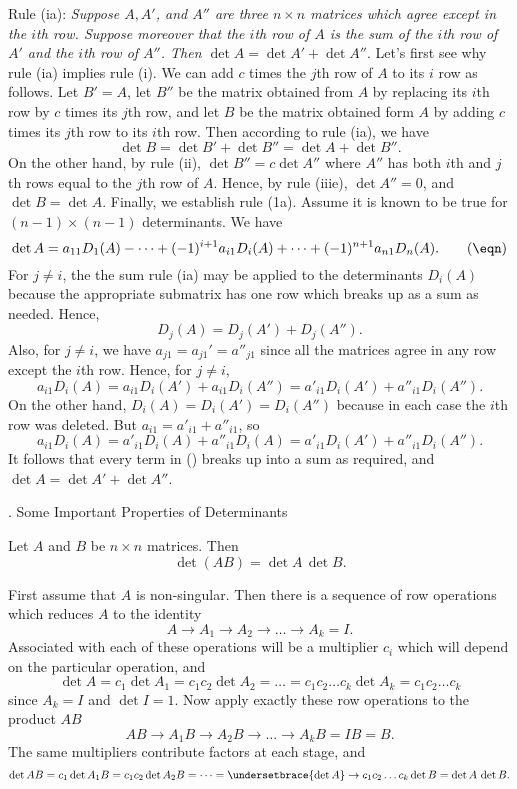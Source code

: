\noindent
Rule (ia):  {\it Suppose $A, A'$, and $A''$ are three $n\times n$
matrices which agree except in the $i$th row.  Suppose moreover
that the $i$th row of $A$ is the sum of the $i$th row of $A'$
and the $i$th row of $A''$.  Then  $\det A = \det A' + \det A''$}.
\medskip
Let's first see why rule (ia) implies rule (i).   We can add
$c$ times the $j$th row of $A$ to its $i$ row as follows.
Let $B' = A$, let $B''$ be the matrix obtained from $A$ by
replacing its $i$th row by $c$ times its $j$th row, and let
$B$ be the matrix obtained form $A$ by adding $c$ times its $j$th row
to its $i$th row.
 Then according to rule (ia), we have
$$
\det B = \det B' + \det B'' = \det A + \det B''.
$$
On the other hand, by rule (ii), $\det B'' = c\det A''$
where $A''$ has both $i$th and $j$th rows equal to the
$j$th row of $A$.  Hence, by rule (iiie), $\det A'' = 0$,
and $\det B = \det A$.
\medskip
Finally, we establish rule (1a).  Assume it is known to be true
for $(n-1)\times(n-1)$ determinants.  We have
\nexteqn
$$
\det A = a_{11}D_1(A) - \dots + (-1)^{i+1}a_{i1}D_i(A) +
\dots + (-1)^{n+1}a_{n1}D_n(A).\tag\eqn
$$
For $j\not= i$, the the sum rule (ia) may be applied to the
determinants $D_i(A)$ because the appropriate submatrix
has one row which breaks up as a sum as needed.  Hence,
$$
D_j(A) = D_j(A') + D_j(A'').
$$
Also, for $j\not = i$, we have $a_{j1} = a_{j1}'  = a''_{j1}$ since
all the matrices agree in any row except the $i$th row.
Hence, for $j\not=i$,
$$
a_{i1}D_i(A) = a_{i1}D_i(A') + a_{i1}D_i(A'')
= a'_{i1}D_i(A') + a''_{i1}D_i(A'').
$$
On the other hand, $D_i(A) = D_i(A') = D_i(A'')$ because
in each case the $i$th row was deleted.
But $a_{i1} = a'_{i1} + a''_{i1}$, so
$$
a_{i1}D_i(A) = a'_{i1}D_i(A) + a''_{i1}D_i(A)
= a'_{i1}D_i(A') + a''_{i1}D_i(A'').
$$
It follows that every term in (\eqn) breaks up into a sum
as required, and $\det A = \det A' + \det A''$.
\bigskip

\bigskip

\head \sn.  Some Important Properties of Determinants \endhead

\nextthm
{}
Let $A$ and $B$ be $n\times n$ matrices.   Then
$$
\det (AB) = \det A\, \det B.
$$
\endproclaim

  First assume that $A$ is non-singular.   
Then there is a sequence of row operations which reduces $A$
to the identity
$$
A \to A_1 \to A_2 \to \hdots \to A_k = I.
$$
Associated with each of these operations will be a multiplier
$c_i$ which will depend on the particular operation, and
$$
\det A = c_1\det A_1 = c_1c_2\det A_2 = \dots = 
c_1c_2\dots c_k\det A_k = c_1c_2\dots c_k
$$
since $A_k =I$ and $\det I = 1$.   Now apply exactly these
row operations to the product $AB$
$$
AB \to A_1B \to A_2B \to \hdots \to A_kB = IB = B.
$$
The same multipliers contribute factors at each stage, and
$$
\det AB = c_1 \det A_1B = c_1c_2\det A_2B =
\dots = \undersetbrace{\det A}\to{c_1c_2\dots c_k}\det B
      = \det A\, \det B.
$$

